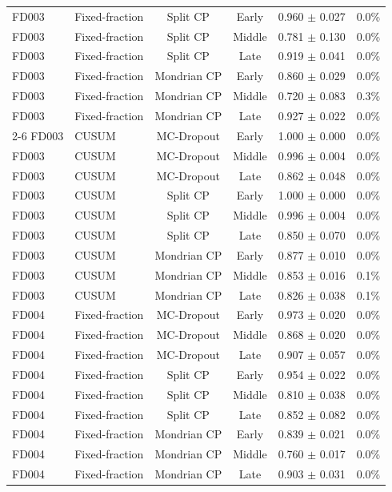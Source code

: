 \begin{table}[t]
\begin{tabular}{llcccc}
FD003 & Fixed-fraction & Split CP & Early & 0.960 $\pm$ 0.027 & 0.0\% \\
FD003 & Fixed-fraction & Split CP & Middle & 0.781 $\pm$ 0.130 & 0.0\% \\
FD003 & Fixed-fraction & Split CP & Late & 0.919 $\pm$ 0.041 & 0.0\% \\
FD003 & Fixed-fraction & Mondrian CP & Early & 0.860 $\pm$ 0.029 & 0.0\% \\
FD003 & Fixed-fraction & Mondrian CP & Middle & 0.720 $\pm$ 0.083 & 0.3\% \\
FD003 & Fixed-fraction & Mondrian CP & Late & 0.927 $\pm$ 0.022 & 0.0\% \\
\cmidrule{2-6}
FD003 & CUSUM & MC-Dropout & Early & 1.000 $\pm$ 0.000 & 0.0\% \\
FD003 & CUSUM & MC-Dropout & Middle & 0.996 $\pm$ 0.004 & 0.0\% \\
FD003 & CUSUM & MC-Dropout & Late & 0.862 $\pm$ 0.048 & 0.0\% \\
FD003 & CUSUM & Split CP & Early & 1.000 $\pm$ 0.000 & 0.0\% \\
FD003 & CUSUM & Split CP & Middle & 0.996 $\pm$ 0.004 & 0.0\% \\
FD003 & CUSUM & Split CP & Late & 0.850 $\pm$ 0.070 & 0.0\% \\
FD003 & CUSUM & Mondrian CP & Early & 0.877 $\pm$ 0.010 & 0.0\% \\
FD003 & CUSUM & Mondrian CP & Middle & 0.853 $\pm$ 0.016 & 0.1\% \\
FD003 & CUSUM & Mondrian CP & Late & 0.826 $\pm$ 0.038 & 0.1\% \\
\midrule
FD004 & Fixed-fraction & MC-Dropout & Early & 0.973 $\pm$ 0.020 & 0.0\% \\
FD004 & Fixed-fraction & MC-Dropout & Middle & 0.868 $\pm$ 0.020 & 0.0\% \\
FD004 & Fixed-fraction & MC-Dropout & Late & 0.907 $\pm$ 0.057 & 0.0\% \\
FD004 & Fixed-fraction & Split CP & Early & 0.954 $\pm$ 0.022 & 0.0\% \\
FD004 & Fixed-fraction & Split CP & Middle & 0.810 $\pm$ 0.038 & 0.0\% \\
FD004 & Fixed-fraction & Split CP & Late & 0.852 $\pm$ 0.082 & 0.0\% \\
FD004 & Fixed-fraction & Mondrian CP & Early & 0.839 $\pm$ 0.021 & 0.0\% \\
FD004 & Fixed-fraction & Mondrian CP & Middle & 0.760 $\pm$ 0.017 & 0.0\% \\
FD004 & Fixed-fraction & Mondrian CP & Late & 0.903 $\pm$ 0.031 & 0.0\% \\

\end{tabular}
\end{table}
